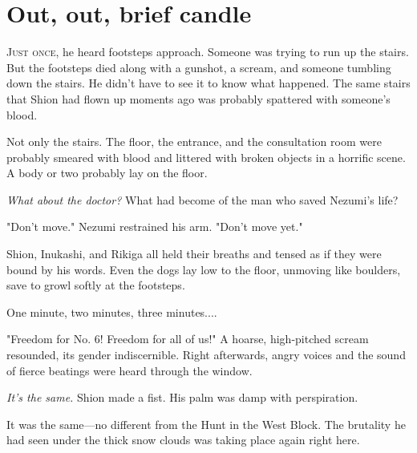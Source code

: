 
\chapter{Out, out, brief candle}


\lettrine{J}{ust once}, he heard footsteps approach. Someone was trying to run up the
stairs. But the footsteps died along with a gunshot, a scream, and
someone tumbling down the stairs. He didn't have to see it to know what
happened. The same stairs that Shion had flown up moments ago was
probably spattered with someone's blood.

Not only the stairs. The floor, the entrance, and the consultation room
were probably smeared with blood and littered with broken objects in a
horrific scene. A body or two probably lay on the floor.

\emph{What about the doctor?} What had become of the man who saved Nezumi's
life?

"Don't move." Nezumi restrained his arm. "Don't move yet."

Shion, Inukashi, and Rikiga all held their breaths and tensed as if they
were bound by his words. Even the dogs lay low to the floor, unmoving
like boulders, save to growl softly at the footsteps.

One minute, two minutes, three minutes....

"Freedom for No. 6! Freedom for all of us!" A hoarse, high-pitched
scream resounded, its gender indiscernible. Right afterwards, angry
voices and the sound of fierce beatings were heard through the window.

\emph{It's the same.} Shion made a fist. His palm was damp with perspiration.

It was the same---no different from the Hunt in the West Block. The
brutality he had seen under the thick snow clouds was taking place again
right here.

